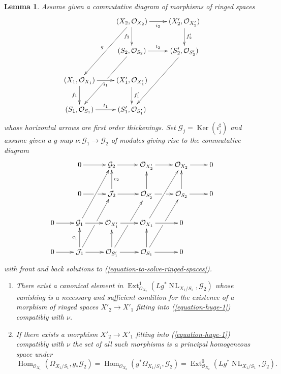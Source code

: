 \documentclass{stacks-project}
\theoremstyle{plain}
\newtheorem{lemma}[subsection]{Lemma}
\theoremstyle{definition}
\theoremstyle{remark}
\numberwithin{equation}{subsection}
\def\Hom{\mathop{\mathrm{Hom}}\nolimits}
\def\Ext{\mathop{\mathrm{Ext}}\nolimits}
\def\NL{\mathop{N\!L}\nolimits}
\def\Ker{\mathop{\mathrm{Ker}}}
\begin{document}
\begin{lemma}
\label{lemma-huge-diagram-ringed-spaces}
Assume given a commutative diagram of morphisms of ringed spaces
\begin{equation}
\label{equation-huge-1}
\vcenter{
\xymatrix{
& (X_2, \mathcal{O}_{X_2}) \ar[r]_{i_2} \ar[d]_{f_2} \ar[ddl]_g &
(X'_2, \mathcal{O}_{X'_2}) \ar[d]^{f'_2} \\
& (S_2, \mathcal{O}_{S_2}) \ar[r]^{t_2} \ar[ddl]|\hole &
(S'_2, \mathcal{O}_{S'_2}) \ar[ddl] \\
(X_1, \mathcal{O}_{X_1}) \ar[r]_{i_1} \ar[d]_{f_1} &
(X'_1, \mathcal{O}_{X'_1}) \ar[d]^{f'_1} \\
(S_1, \mathcal{O}_{S_1}) \ar[r]^{t_1} &
(S'_1, \mathcal{O}_{S'_1})
}
}
\end{equation}
whose horizontal arrows are first order thickenings. Set
$\mathcal{G}_j = \Ker(i_j^\sharp)$ and assume given
a $g$-map $\nu : \mathcal{G}_1 \to \mathcal{G}_2$ of modules
giving rise to the commutative diagram
\begin{equation}
\label{equation-huge-2}
\vcenter{
\xymatrix{
& 0 \ar[r] & \mathcal{G}_2 \ar[r] &
\mathcal{O}_{X'_2} \ar[r] &
\mathcal{O}_{X_2} \ar[r] & 0 \\
& 0 \ar[r]|\hole &
\mathcal{J}_2 \ar[u]_{c_2} \ar[r] &
\mathcal{O}_{S'_2} \ar[u] \ar[r]|\hole &
\mathcal{O}_{S_2} \ar[u] \ar[r] & 0 \\
0 \ar[r] & \mathcal{G}_1 \ar[ruu] \ar[r] &
\mathcal{O}_{X'_1} \ar[r] &
\mathcal{O}_{X_1} \ar[ruu] \ar[r] & 0 \\
0 \ar[r] & \mathcal{J}_1 \ar[ruu]|\hole \ar[u]^{c_1} \ar[r] &
\mathcal{O}_{S'_1} \ar[ruu]|\hole \ar[u] \ar[r] &
\mathcal{O}_{S_1} \ar[ruu]|\hole \ar[u] \ar[r] & 0
}
}
\end{equation}
with front and back solutions to (\ref{equation-to-solve-ringed-spaces}).
\begin{enumerate}
\item There exist a canonical element in
$\Ext^1_{\mathcal{O}_{X_2}}(Lg^*\NL_{X_1/S_1}, \mathcal{G}_2)$
whose vanishing is a necessary and sufficient condition for the existence
of a morphism of ringed spaces $X'_2 \to X'_1$ fitting into
(\ref{equation-huge-1}) compatibly with $\nu$.
\item If there exists a morphism $X'_2 \to X'_1$ fitting into
(\ref{equation-huge-1}) compatibly with $\nu$ the set of all such morphisms
is a principal homogeneous space under
$$
\Hom_{\mathcal{O}_{X_1}}(\Omega_{X_1/S_1}, g_*\mathcal{G}_2) =
\Hom_{\mathcal{O}_{X_2}}(g^*\Omega_{X_1/S_1}, \mathcal{G}_2) =
\Ext^0_{\mathcal{O}_{X_2}}(Lg^*\NL_{X_1/S_1}, \mathcal{G}_2).
$$
\end{enumerate}
\end{lemma}
\end{document}
